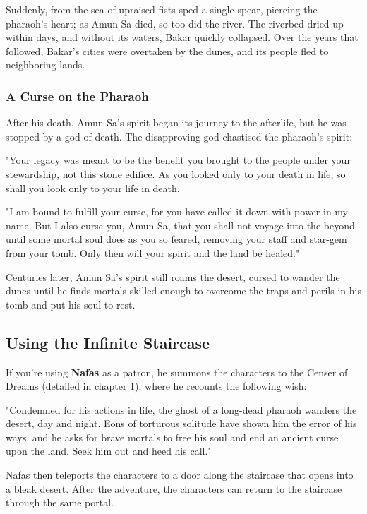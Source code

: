 \documentclass[10pt,a4paper,twoside,bg=print,twocolumn,openany,nodeprecatedcode]{dndbook}
\begin{document}
Suddenly, from the sea of upraised fists sped a single spear, piercing the pharaoh's heart; as Amun Sa died, so too did the river. The riverbed dried up within days, and without its waters, Bakar quickly collapsed. Over the years that followed, Bakar's cities were overtaken by the dunes, and its people fled to neighboring lands.

\subsubsection{A Curse on the Pharaoh}
After his death, Amun Sa's spirit began its journey to the afterlife, but he was stopped by a god of death. The disapproving god chastised the pharaoh's spirit:

"Your legacy was meant to be the benefit you brought to the people under your stewardship, not this stone edifice. As you looked only to your death in life, so shall you look only to your life in death.

"I am bound to fulfill your curse, for you have called it down with power in my name. But I also curse you, Amun Sa, that you shall not voyage into the beyond until some mortal soul does as you so feared, removing your staff and star-gem from your tomb. Only then will your spirit and the land be healed."

Centuries later, Amun Sa's spirit still roams the desert, cursed to wander the dunes until he finds mortals skilled enough to overcome the traps and perils in his tomb and put his soul to rest.

\subsection{Using the Infinite Staircase}
If you're using \textbf{Nafas} as a patron, he summons the characters to the Censer of Dreams (detailed in chapter 1), where he recounts the following wish:

\begin{DndReadAloud}{}
"Condemned for his actions in life, the ghost of a long-dead pharaoh wanders the desert, day and night. Eons of torturous solitude have shown him the error of his ways, and he asks for brave mortals to free his soul and end an ancient curse upon the land. Seek him out and heed his call."

\end{DndReadAloud}

Nafas then teleports the characters to a door along the staircase that opens into a bleak desert. After the adventure, the characters can return to the staircase through the same portal.
\end{document}
